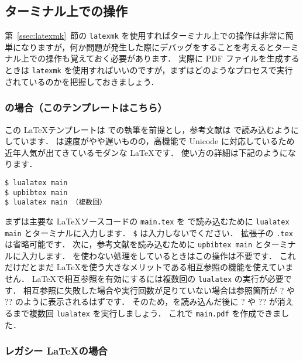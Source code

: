 \subsection{ターミナル上での操作}
\label{ssec:terminal}

第~\ref{ssec:latexmk}~節の \verb|latexmk| を使用すればターミナル上での操作は非常に簡単になりますが，何か問題が発生した際にデバッグをすることを考えるとターミナル上での操作も覚えておく必要があります．
実際に PDF ファイルを生成するときは \verb|latexmk| を使用すればいいのですが，まずはどのようなプロセスで実行されているのかを把握しておきましょう．

\subsubsection*{\LuaLaTeX の場合（このテンプレートはこちら）}

この \LaTeX テンプレートは \LuaLaTeX での執筆を前提とし，参考文献は \upBibTeX で読み込むようにしています．
\LuaLaTeX は速度がやや遅いものの，高機能で Unicode に対応しているため近年人気が出てきているモダンな \LaTeX です．
使い方の詳細は下記のようになります．

\begin{tcolorbox}[title={\LuaLaTeX$+$\upBibTeX}, colback=red!5!white, colframe=red!75!black]
\begin{verbatim}
$ lualatex main
$ upbibtex main
$ lualatex main （複数回）
\end{verbatim}
\end{tcolorbox}

まずは主要な \LaTeX ソースコードの \verb|main.tex| を \LuaLaTeX で読み込むために \verb|lualatex main| とターミナルに入力します．
\verb|$| は入力しないでください．
拡張子の \verb|.tex| は省略可能です．
次に，参考文献を読み込むために \verb|upbibtex main| とターミナルに入力します．
\BibTeX を使わない処理をしているときはこの操作は不要です．
これだけだとまだ \LaTeX を使う大きなメリットである相互参照の機能を使えていません．
\LaTeX で相互参照を有効にするには複数回の \verb|lualatex| の実行が必要です．
相互参照に失敗した場合や実行回数が足りていない場合は参照箇所が ? や ?? のように表示されるはずです．
そのため，\upBibTeX を読み込んだ後に ? や ?? が消えるまで複数回 \verb|lualatex| を実行しましょう．
これで \verb|main.pdf| を作成できました．

\subsubsection*{レガシー \LaTeX の場合}

